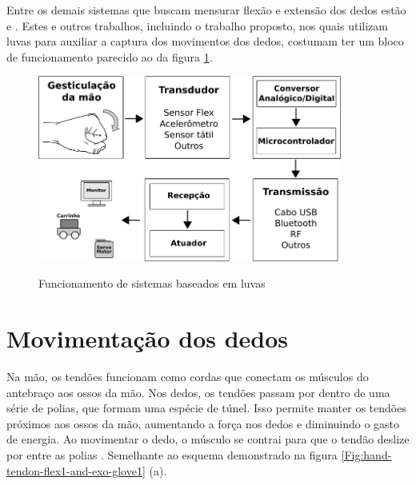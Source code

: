 \documentclass[
	12pt,				%
	openright,			%
	oneside,			%
	a4paper,			%
	english,			%
	brazil				%
	]{abntex2}
\begin{document}
		Entre os demais sistemas que buscam mensurar flexão e extensão dos dedos estão \cite{syed2012armcontroller} e \cite{michela2013rehab}. Estes e outros trabalhos, incluindo o trabalho proposto, nos quais utilizam luvas para auxiliar a captura dos movimentos dos dedos, costumam ter um bloco de funcionamento parecido ao da figura \ref{Fig:flowchart1}.


		\begin{figure}[h!]
			\centering
			\caption{Funcionamento de sistemas baseados em luvas}
  		\includegraphics[width=10cm]{./figures/flowchart1.png}
  		\label{Fig:flowchart1}
		\end{figure}


		\section{Movimentação dos dedos} \label{movimentacaodosdedos}


		Na mão, os tendões funcionam como cordas que conectam os músculos do antebraço aos ossos da mão. Nos dedos, os tendões passam por dentro de uma série de polias, que formam uma espécie de túnel. Isso permite manter os tendões próximos aos ossos da mão, aumentando a força nos dedos e diminuindo o gasto de energia. Ao movimentar o dedo, o músculo se contrai para que o tendão deslize por entre as polias \cite{drricardocirurgiao}. Semelhante ao esquema demonstrado na figura \ref{Fig:hand-tendon-flex1-and-exo-glove1} (a).
\end{document}
